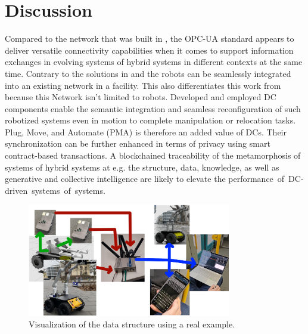 \documentclass[conference]{IEEEtran}
\begin{document}
\section{Discussion}
Compared to the network that was built in \cite{SotaCAN}, the OPC-UA standard appears to deliver versatile connectivity capabilities when it comes to support information exchanges in evolving systems of hybrid systems in different contexts at the same time. Contrary to the solutions in \cite{SotaRaconteur} and \cite{SotaFusion} the robots can be seamlessly integrated into an existing network in a facility. This also differentiates this work from \cite{SotaROS} because this Network isn't limited to robots. Developed and employed DC components enable the  semantic integration and  seamless reconfiguration of such robotized systems even in motion to complete manipulation or relocation tasks. Plug, Move, and Automate (PMA) is therefore an added value of DCs. Their synchronization can be further enhanced in terms of privacy using smart contract-based transactions. A blockchained traceability of the metamorphosis of systems of hybrid systems at e.g. the structure, data, knowledge, as well as generative and collective intelligence are likely to elevate the \mbox{performance of DC-driven systems of systems.}

\begin{figure}[b]
	\centerline{\includegraphics[width=8.9cm]{Pictures/AufbauBilder.png}}
	\caption{Visualization of the data structure using a real example.}
	\label{fig:AufbauBilder}
\end{figure}

\end{document}
